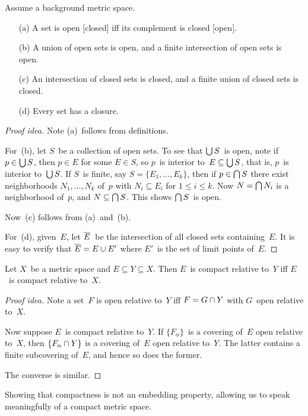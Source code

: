 \begin{thm}
Assume a background metric space.
\begin{enumerate}[itemsep=0pt]
\item[(a)] A set is open [closed] iff its complement is closed [open].
\item[(b)] A union of open sets is open, and a finite intersection of open sets is open.
\item[(c)] An intersection of closed sets is closed, and a finite union of closed sets is closed.
\item[(d)] Every set has a closure.
\end{enumerate}
\end{thm}
\begin{proof}[Proof idea]
Note (a)~follows from definitions.

For~(b), let \(S\)~be a collection of open sets. To see that \(\bigcup S\)~is open, note if \(p\in\bigcup S\), then \(p\in E\) for some \(E\in S\), so \(p\)~is interior to~\(E\subseteq\bigcup S\), that is, \(p\)~is interior to~\(\bigcup S\). If \(S\)~is finite, say \(S=\{E_1,\ldots,E_k\}\), then if \(p\in\bigcap S\) there exist neighborhoods \(N_1,\ldots,N_k\) of~\(p\) with \(N_i\subseteq E_i\) for \(1\le i\le k\). Now \(N=\bigcap N_i\) is a neighborhood of~\(p\), and \(N\subseteq\bigcap S\). This shows \(\bigcap S\)~is open.

Now~(c) follows from (a)~and~(b).

For~(d), given~\(E\), let \(\overline{E}\)~be the intersection of all closed sets containing~\(E\). It is easy to verify that \(\overline{E}=E\cup E'\) where \(E'\)~is the set of limit points of~\(E\).
\end{proof}

\begin{thm}
Let \(X\)~be a metric space and \(E\subseteq Y\subseteq X\). Then \(E\)~is compact relative to~\(Y\) iff \(E\)~is compact relative to~\(X\).
\end{thm}
\begin{proof}[Proof idea]
Note a set~\(F\) is open relative to~\(Y\) iff \(F=G\cap Y\) with \(G\)~open relative to~\(X\).

Now suppose \(E\)~is compact relative to~\(Y\). If \(\{F_{\alpha}\}\)~is a covering of~\(E\) open relative to~\(X\), then \(\{F_{\alpha}\cap Y\}\) is a covering of~\(E\) open relative to~\(Y\). The latter contains a finite subcovering of~\(E\), and hence so does the former.

The converse is similar.
\end{proof}
\begin{app}
Showing that compactness is not an embedding property, allowing us to speak meaningfully of a compact metric space.
\end{app}

